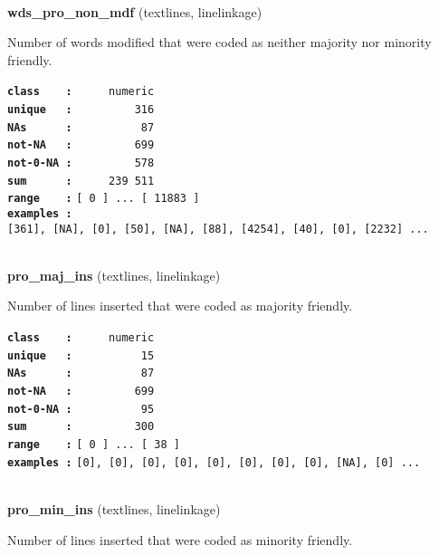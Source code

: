 \documentclass[]{article}
\begin{document}
~

\textbf{wds\_pro\_non\_mdf} (textlines, linelinkage)

Number of words modified that were coded as neither majority nor
minority friendly.

\textbf{\texttt{class\ \ \ \ :}} \texttt{~~~~~numeric}\\
\textbf{\texttt{unique\ \ \ :}} \texttt{~~~~~~~~~316}\\
\textbf{\texttt{NAs\ \ \ \ \ \ :}} \texttt{~~~~~~~~~~87}\\
\textbf{\texttt{not-NA\ \ \ :}} \texttt{~~~~~~~~~699}\\
\textbf{\texttt{not-0-NA\ :}} \texttt{~~~~~~~~~578}\\
\textbf{\texttt{sum\ \ \ \ \ \ :}} \texttt{~~~~~239~511}\\
\textbf{\texttt{range\ \ \ \ :}}
\texttt{{[}\ 0\ {]}\ ...\ {[}\ 11883\ {]}}\\
\textbf{\texttt{examples\ :}}
\texttt{{[}361{]},\ {[}NA{]},\ {[}0{]},\ {[}50{]},\ {[}NA{]},\ {[}88{]},\ {[}4254{]},\ {[}40{]},\ {[}0{]},\ {[}2232{]}\ ...}\\

~

\textbf{pro\_maj\_ins} (textlines, linelinkage)

Number of lines inserted that were coded as majority friendly.

\textbf{\texttt{class\ \ \ \ :}} \texttt{~~~~~numeric}\\
\textbf{\texttt{unique\ \ \ :}} \texttt{~~~~~~~~~~15}\\
\textbf{\texttt{NAs\ \ \ \ \ \ :}} \texttt{~~~~~~~~~~87}\\
\textbf{\texttt{not-NA\ \ \ :}} \texttt{~~~~~~~~~699}\\
\textbf{\texttt{not-0-NA\ :}} \texttt{~~~~~~~~~~95}\\
\textbf{\texttt{sum\ \ \ \ \ \ :}} \texttt{~~~~~~~~~300}\\
\textbf{\texttt{range\ \ \ \ :}}
\texttt{{[}\ 0\ {]}\ ...\ {[}\ 38\ {]}}\\
\textbf{\texttt{examples\ :}}
\texttt{{[}0{]},\ {[}0{]},\ {[}0{]},\ {[}0{]},\ {[}0{]},\ {[}0{]},\ {[}0{]},\ {[}0{]},\ {[}NA{]},\ {[}0{]}\ ...}\\

~

\textbf{pro\_min\_ins} (textlines, linelinkage)

Number of lines inserted that were coded as minority friendly.
\end{document}
